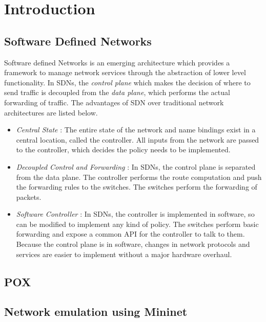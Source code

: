\chapter{Introduction}

\section{Software Defined Networks}
Software defined Networks is an emerging architecture which provides a framework to manage network services through the abstraction of lower level functionality. In SDNs, the \emph{control plane} which makes the decision of where to send traffic is decoupled from the \emph{data plane}, which performs the actual forwarding of traffic. The advantages of SDN over traditional network architectures are listed below.
\begin{itemize}
	\item \textit{Central State} : The entire state of the network and name bindings exist in a central location, called the controller. All inputs from the network are passed to the controller, which decides the policy needs to be implemented. 
	\item \textit{Decoupled Control and Forwarding} : In SDNs, the control plane is separated from the data plane. The controller performs the route computation and push the forwarding rules to the switches. The switches perform the forwarding of packets. 
	\item \textit{Software Controller} : In SDNs, the controller is implemented in software, so can be modified to implement any kind of policy. The switches perform basic forwarding and expose a common API for the controller to talk to them. Because the control plane is in software, changes in network protocols and services are easier to implement without a major hardware overhaul. 
\end{itemize}

\section{POX}

\section{Network emulation using Mininet}